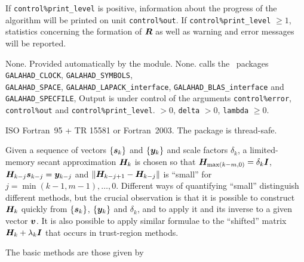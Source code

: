 \documentclass{galahad}
\newcommand{\packagename}{LMS}
\begin{document}

\galinfo
If {\tt control\%print\_level} is positive, information about the progress
of the algorithm will be printed on unit {\tt control\-\%out}.
If {\tt control\%print\_level} $\geq 1$, statistics concerning the
formation of ${\bm{R}}$
as well as warning and error messages will be reported.


\galgeneral

\galcommon None.
\galworkspace Provided automatically by the module.
\galroutines None.
\galmodules {\tt \packagename} calls the \galahad\ packages
{\tt GALAHAD\_CLOCK},
{\tt GALAHAD\_SY\-M\-BOLS}, \\
{\tt GALAHAD\-\_SPACE},
{\tt GALAHAD\_LAPACK\_interface},
{\tt GALAHAD\_BLAS\_interface} and
{\tt GALAHAD\_SPECFILE},
\galio Output is under control of the arguments
 {\tt control\%error}, {\tt control\%out} and {\tt control\%print\_level}.
 $> 0$, {\tt delta} $> 0$, {\tt lambda} $\geq 0$.

\galportability ISO Fortran~95 + TR 15581 or Fortran~2003.
The package is thread-safe.



\galmethod

Given a sequence of vectors $\{{\bm{s}}_k\}$ and $\{{\bm{y}}_k\}$ and scale factors
$\delta_k$, a limited-memory secant approximation ${\bm{H}}_k$ is chosen so that
${\bm{H}}_{\max(k-m,0)} = \delta_k {\bm{I}}$, ${\bm{H}}_{k-j} {\bm{s}}_{k-j} = {\bm{y}}_{k-j}$
and $\| {\bm{H}}_{k-j+1} - {\bm{H}}_{k-j}\|$ is ``small'' for
$j = \min(k-1,m-1), \ldots, 0$.
Different ways of quantifying ``small'' distinguish different methods,
but the crucial
observation is that it is possible to construct ${\bm{H}}_k$ quickly from
$\{{\bm{s}}_k\}$, $\{{\bm{y}}_k\}$ and $\delta_k$, and to apply it and its inverse
to a given vector ${\bm{v}}$. It is also possible to apply similar formulae
to the ``shifted'' matrix ${\bm{H}}_k + \lambda_k {\bm{I}}$ that occurs in
trust-region methods.
\vspace*{1mm}

\galreferences
\vspace*{1mm}

\noindent
The basic methods are those given by
\vspace*{1mm}
\end{document}
